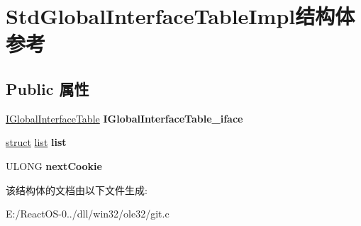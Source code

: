 \hypertarget{struct_std_global_interface_table_impl}{}\section{Std\+Global\+Interface\+Table\+Impl结构体 参考}
\label{struct_std_global_interface_table_impl}
\subsection*{Public 属性}
\begin{DoxyCompactItemize}
\item 
\mbox{\label{struct_std_global_interface_table_impl_ab9467d0b7af5226b4b5853a968c4b7e5}} 
\hyperlink{interface_i_global_interface_table}{I\+Global\+Interface\+Table} {\bfseries I\+Global\+Interface\+Table\+\_\+iface}
\item 
\mbox{\label{struct_std_global_interface_table_impl_a26a4a4c2ffb7bdc089e9cc728608d3ef}} 
\hyperlink{interfacestruct}{struct} \hyperlink{classlist}{list} {\bfseries list}
\item 
\mbox{\label{struct_std_global_interface_table_impl_a32c90d1de7b212538f05ff82888d153e}} 
U\+L\+O\+NG {\bfseries next\+Cookie}
\end{DoxyCompactItemize}


该结构体的文档由以下文件生成\+:\begin{DoxyCompactItemize}
\item 
E\+:/\+React\+O\+S-\/0../dll/win32/ole32/git.\+c\end{DoxyCompactItemize}
